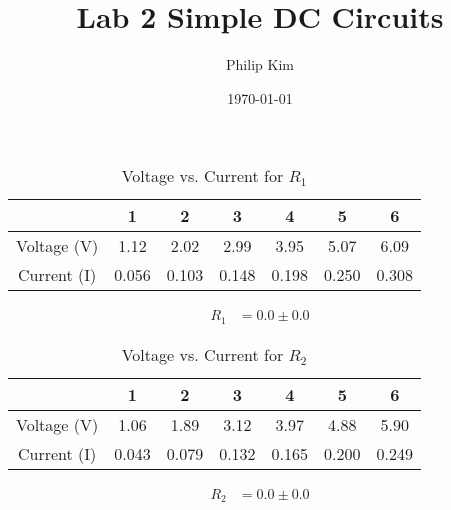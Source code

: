 \documentclass[a4paper]{article}
\title{Lab 2 Simple DC Circuits}
\author{Philip Kim}
\date{\today}
\begin{document}
\maketitle

\begin{table}[h!]
  \begin{center}
    \caption{Voltage vs. Current for \(R_1\)}\label{tab:table1}
    \begin{tabular}{|c|c|c|c|c|c|c|}\hline
      & 1 & 2 & 3 & 4 & 5 & 6 \\ \hline
      Voltage (V) & 1.12 & 2.02 & 2.99 & 3.95 & 5.07 & 6.09 \\ \hline
      Current (I) & 0.056 & 0.103 & 0.148 & 0.198 & 0.250 & 0.308 \\ \hline
    \end{tabular}
  \end{center}
  \begin{center}
    \begin{equation}
      \begin{split}
        R_1 &= \boxed{0.0 \pm 0.0}
      \end{split}
    \end{equation}
  \end{center}
\end{table}

\begin{table}[h!]
  \begin{center}
    \caption{Voltage vs. Current for \(R_2\)}\label{tab:table1}
    \begin{tabular}{|c|c|c|c|c|c|c|}\hline
      & 1 & 2 & 3 & 4 & 5 & 6 \\ \hline
      Voltage (V) & 1.06 & 1.89 & 3.12 & 3.97 & 4.88 & 5.90 \\ \hline
      Current (I) & 0.043 & 0.079 & 0.132 & 0.165 & 0.200 & 0.249 \\ \hline
    \end{tabular}
  \end{center}
  \begin{center}
    \begin{equation}
      \begin{split}
        R_2 &= \boxed{0.0 \pm 0.0}
      \end{split}
    \end{equation}
  \end{center}
\end{table}
\end{document}
